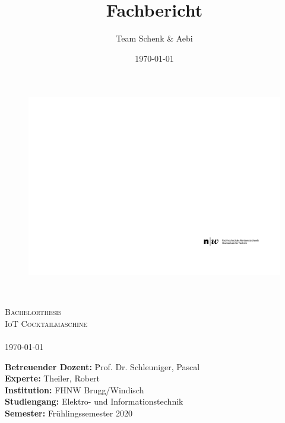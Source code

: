 \documentclass[final]{fhnwreport}       	%
\title{Fachbericht}  		        		%
\author{Team Schenk \& Aebi}      				    %
\date{\today}          				   	%
\begin{document}
\thispagestyle{empty}
	\begin{figure}
		 \vspace*{-\topskip}\vspace*{-\headsep}
		\includegraphics[scale=1]{graphics/fhnw_ht_logo_de.pdf}
	\end{figure}
	\begin{center}
		\vspace*{2cm}
		{\huge{\textbf{\thetitle}}}\\
		\vspace*{0.5cm}
		
		{\scshape\Large Bachelorthesis \\ IoT Cocktailmaschine \\ \theauthor \\} \Large{\today}
		\vfill
		\begin{normalsize}
			{\begin{tabbing}
					\textbf{Betreuender Dozent:} \hspace{5cm}\= Prof. Dr. Schleuniger, Pascal\\[0.8cm]		
					\textbf{Experte:} \>Theiler, Robert \\[0.8cm]
					\textbf{Institution:} \>FHNW Brugg/Windisch \\[0.8cm]
					\textbf{Studiengang:} \>Elektro- und Informationstechnik
					\\[0.8cm]	\textbf{Semester:} \>Frühlingssemester 2020
			\end{tabbing}}
		\end{normalsize}
		\vfill
	\end{center}
\clearpage
			
\end{document}

